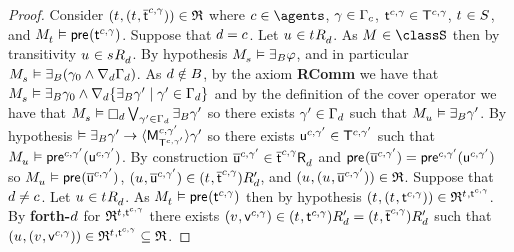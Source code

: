 \begin{proof}
Consider $(\kStateT, (\kStateT, \aPStateT[\agentC, \gamma])) \in \refinement$ where $\agentC \in \agents$, $\gamma \in \Gamma_\agentC$, $\aStateT[\agentC, \gamma] \in \aStatesT[\agentC, \gamma]$, $\kStateT \in \kStates$, and $\kPModel{\kStateT} \entails \aPrecondition(\aStateT[\agentC, \gamma])$.
Suppose that $\agentD = \agentC$.
Let $\kStateU \in \kSuccessorsD{\kStateT}$.
As $\kModel \in \classS$ then by transitivity $\kStateU \in \kSuccessorsD{\kStateS}$.
By hypothesis $\kPModel{\kStateS} \entails \someactsBs \phi$, and in particular $\kPModel{\kStateS} \entails \someactsBs (\gamma_0 \land \coversD \Gamma_\agentD)$.
As $\agentD \notin \agentsB$, by the \axiomAamlS{} axiom {\bf RComm} we have that $\kPModel{\kStateS} \entails \someactsBs \gamma_0 \land \coversD \{\someactsBs \gamma' \mid \gamma' \in \Gamma_\agentD\}$ and by the definition of the cover operator we have that $\kPModel{\kStateS} \entails \necessaryD \bigvee_{\gamma' \in \Gamma_\agentD} \someactsBs \gamma'$ so there exists $\gamma' \in \Gamma_\agentD$ such that $\kPModel{\kStateU} \entails \someactsBs \gamma'$.
By hypothesis $\entails \someactsBs \gamma' \implies \actionE{\aPModel[\agentC, \gamma']{\aStatesT[\agentC, \gamma']}} \gamma'$ so there exists $\aStateU[\agentC, \gamma'] \in \aStatesT[\agentC, \gamma']$ such that $\kPModel{\kStateU} \entails \aPrecondition[\agentC, \gamma'](\aStateU[\agentC, \gamma'])$.
By construction $\aPStateU[\agentC, \gamma'] \in \aSuccessorsD{\aPStateT[\agentC, \gamma]}$ and $\aPrecondition(\aPStateU[\agentC, \gamma']) = \aPrecondition[\agentC, \gamma'](\aStateU[\agentC, \gamma'])$ so $\kPModel{\kStateU} \entails \aPrecondition(\aPStateU[\agentC, \gamma'])$, $(\kStateU, \aPStateU[\agentC, \gamma']) \in \kSuccessorsPD{(\kStateT, \aPStateT[\agentC, \gamma])}$, and $(\kStateU, (\kStateU, \aPStateU[\agentC, \gamma'])) \in \refinement$.
Suppose that $\agentD \neq \agentC$.
Let $\kStateU \in \kSuccessorsD{\kStateT}$.
As $\kPModel{\kStateT} \entails \aPrecondition(\aStateT[\agentC, \gamma])$ then by hypothesis $(\kStateT, (\kStateT, \aStateT[\agentC, \gamma])) \in \refinement^{\kStateT, \aStateT[\agentC, \gamma]}$.
By {\bf forth-$\agentD$} for $\refinement^{\kStateT, \aStateT[\agentC, \gamma]}$ there exists $(\kStateV, \aStateV[\agentC, \gamma]) \in \kSuccessorsPD{(\kStateT, \aStateT[\agentC, \gamma])} = \kSuccessorsPD{(\kStateT, \aPStateT[\agentC, \gamma])}$ such that $(\kStateU, (\kStateV, \aStateV[\agentC, \gamma])) \in \refinement^{\kStateT, \aStateT[\agentC, \gamma]} \subseteq \refinement$.


\end{proof}
